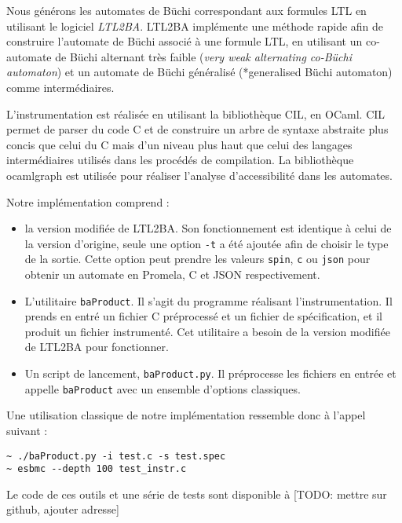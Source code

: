 Nous générons les automates de Büchi correspondant aux formules LTL en
utilisant le logiciel \emph{LTL2BA}\cite{ltl2ba}. LTL2BA implémente
une méthode rapide afin de construire l'automate de Büchi associé à une
formule LTL, en utilisant un co-automate de Büchi alternant très faible
(\emph{very weak alternating co-Büchi automaton}) et un automate de
Büchi généralisé (*generalised Büchi automaton) comme intermédiaires.

L'instrumentation est réalisée en utilisant la bibliothèque
CIL\cite{cil}, en OCaml\cite{ocamlrefman}. CIL permet de parser
du code C et de construire un arbre de syntaxe abstraite plus concis que
celui du C mais d'un niveau plus haut que celui des langages
intermédiaires utilisés dans les procédés de compilation. La
bibliothèque ocamlgraph\cite{ocamlgraph} est utilisée pour réaliser
l'analyse d'accessibilité dans les automates.

Notre implémentation comprend :

\begin{itemize}
\item
  la version modifiée de LTL2BA. Son fonctionnement est identique à
  celui de la version d'origine, seule une option \lstinline!-t! a été
  ajoutée afin de choisir le type de la sortie. Cette option peut
  prendre les valeurs \lstinline!spin!, \lstinline!c! ou
  \lstinline!json! pour obtenir un automate en Promela, C et JSON
  respectivement.
\item
  L'utilitaire \lstinline!baProduct!. Il s'agit du programme réalisant
  l'instrumentation. Il prends en entré un fichier C préprocessé et un
  fichier de spécification, et il produit un fichier instrumenté. Cet
  utilitaire a besoin de la version modifiée de LTL2BA pour fonctionner.
\item
  Un script de lancement, \lstinline!baProduct.py!. Il préprocesse les
  fichiers en entrée et appelle \lstinline!baProduct! avec un ensemble
  d'options classiques.
\end{itemize}

Une utilisation classique de notre implémentation ressemble donc à
l'appel suivant :

\begin{lstlisting}
~ ./baProduct.py -i test.c -s test.spec
~ esbmc --depth 100 test_instr.c
\end{lstlisting}

Le code de ces outils et une série de tests sont disponible à {[}TODO:
mettre sur github, ajouter adresse{]}
